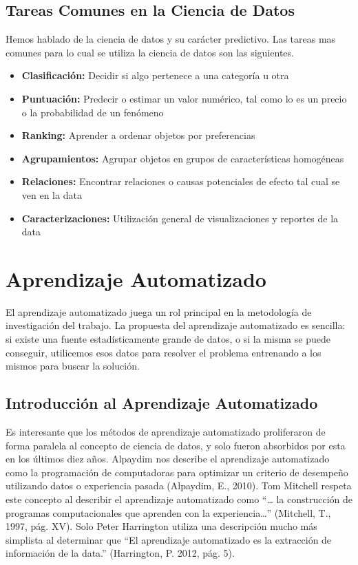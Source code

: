 \documentclass[letterpaper, spanish, 11pt]{report}
\begin{document}
\subsection{Tareas Comunes en la Ciencia de Datos}
Hemos hablado de la ciencia de datos y su carácter predictivo. Las tareas mas comunes para lo cual se utiliza la ciencia de datos son las siguientes.

\begin{itemize}
	\item \textbf{Clasificación:} Decidir si algo pertenece a una categoría u otra
	\item \textbf{Puntuación:} Predecir o estimar un valor numérico, tal como lo es un precio o la probabilidad de un fenómeno
	\item \textbf{Ranking:} Aprender a ordenar objetos por preferencias
	\item \textbf{Agrupamientos:} Agrupar objetos en grupos de características homogéneas
	\item \textbf{Relaciones:} Encontrar relaciones o causas potenciales de efecto tal cual se ven en la data
	\item \textbf{Caracterizaciones:} Utilización general de visualizaciones y reportes de la data
\end{itemize}

\section{Aprendizaje Automatizado}
El aprendizaje automatizado juega un rol principal en la metodología de investigación del trabajo. La propuesta del aprendizaje automatizado es sencilla: si existe una fuente estadísticamente grande de datos, o si la misma se puede conseguir, utilicemos esos datos para resolver el problema entrenando a los mismos para buscar la solución.

\subsection{Introducción al Aprendizaje Automatizado}
Es interesante que los métodos de aprendizaje automatizado proliferaron de forma paralela al concepto de ciencia de datos, y solo fueron absorbidos por esta en los últimos diez años. Alpaydim nos describe el aprendizaje automatizado como la programación de computadoras para optimizar un criterio de desempeño utilizando datos o experiencia pasada (Alpaydim, E., 2010). Tom Mitchell respeta este concepto al describir el aprendizaje automatizado como “… la construcción de programas computacionales que aprenden con la experiencia…” (Mitchell, T., 1997, pág. XV). Solo Peter Harrington utiliza una descripción mucho más simplista al determinar que “El aprendizaje automatizado es la extracción de información de la data.” (Harrington, P. 2012, pág. 5). 
\end{document}
